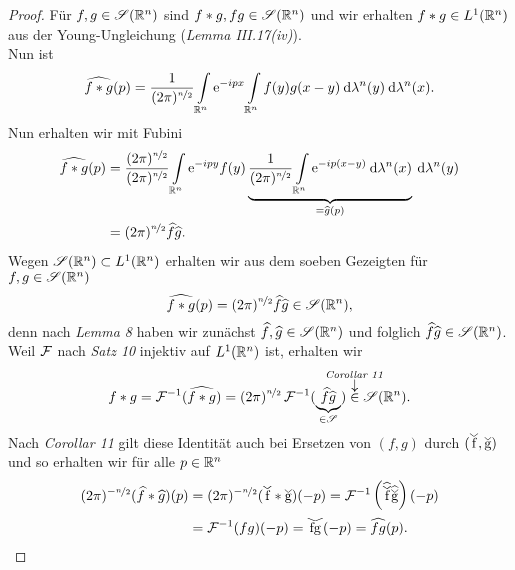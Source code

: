 \documentclass[skript.tex]{subfiles}
\begin{document}
	\begin{proof}
		Für $f,g\in\mathscr{S}(\mathbb{R}^n)$ sind $f \ast g, fg \in \mathscr{S}(\mathbb{R}^n)$ und wir erhalten $f \ast g \in L^1(\mathbb{R}^n)$ aus der Young-Ungleichung (\emph{Lemma III.17(iv)}).\\
		Nun ist
		\[
			\widehat{f \ast g}(p) = \frac{1}{(2\pi)^{\nicefrac{n}{2}}} \int\limits_{\mathbb{R}^n} \mathrm{e}^{-ipx} \int\limits_{\mathbb{R}^n} f(y)g(x-y) \: \mathrm{d}\lambda^n(y)\: \mathrm{d}\lambda^n(x).
		\]
		Nun erhalten wir mit Fubini
		\begin{align*}
			\widehat{f \ast g}(p) &= \frac{(2\pi)^{\nicefrac{n}{2}}}{(2\pi)^{\nicefrac{n}{2}}} \int\limits_{\mathbb{R}^n} \mathrm{e}^{-ipy} f(y) \underbrace{\frac{1}{(2\pi)^{\nicefrac{n}{2}}} \int\limits_{\mathbb{R}^n} \mathrm{e}^{-ip(x-y)} \: \mathrm{d}\lambda^n(x)}_{= \widehat{g}(p)}\: \mathrm{d}\lambda^n(y) \\
			 &= (2\pi)^{\nicefrac{n}{2}} \widehat{f}\widehat{g}.
		\end{align*}
		Wegen $\mathscr{S}(\mathbb{R}^n) \subset L^1(\mathbb{R}^n)$ erhalten wir aus dem soeben Gezeigten für $f,g\in\mathscr{S}(\mathbb{R}^n)$
		\[
				\widehat{f \ast g}(p) = (2\pi)^{\nicefrac{n}{2}} \widehat{f}\widehat{g} \in \mathscr{S}(\mathbb{R}^n),
		\]
		denn nach \emph{Lemma 8} haben wir zunächst $\widehat{f},\widehat{g}\in\mathscr{S}(\mathbb{R}^n)$ und folglich $\widehat{f}\widehat{g} \in \mathscr{S}(\mathbb{R}^n)$.\\
		Weil $\mathcal{F}$ nach \emph{Satz 10} injektiv auf $L^1(\mathbb{R}^n)$ ist, erhalten wir
		\[
			f \ast g = \F^{-1}(\wh{f \ast g}) = (2\pi)^{\nicefrac{n}{2}}\, \F^{-1}(\underbrace{\wh{f}\wh{g}}_{\in \ms{S}}) \darrow{\text{\emph{Corollar 11}}}{\in} \ms{S}(\R^n).
		\]
		Nach \emph{Corollar 11} gilt diese Identität auch bei Ersetzen von $(f,g)$ durch $(\wc{f},\wc{g})$ und so erhalten wir für alle $p \in \mathbb{R}^n$
		\begin{align*}
			(2\pi)^{-\nicefrac{n}{2}}(\wh{f}\ast\wh{g})(p) &= (2\pi)^{-\nicefrac{n}{2}}(\wc{f}\ast\wc{g})(-p) = \F^{-1}\left(\wh{\wc{f}}\wh{\wc{g}}\right)(-p)\\
			&= \F^{-1}(fg)(-p) = \wc{fg}(-p) = \wh{fg}(p).
		\end{align*}
	\end{proof}
\end{document}
